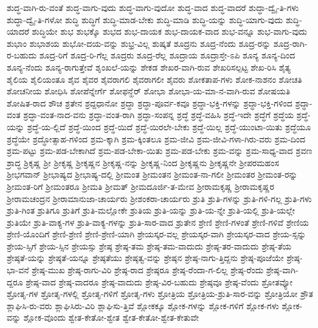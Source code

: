 {ಶುದ್ಧ-ವಾಗಿ-ರು-ವಂತೆ
ಶುದ್ಧ-ವಾಗು-ವುದು
ಶುದ್ಧ-ವಾಗು-ವುದೋ
ಶುದ್ಧ-ವಾದ
ಶುದ್ಧ-ವಾದರೆ
ಶುದ್ಧಾ-ದ್ವೈ-ತಿ-ಗಳು
ಶುದ್ಧಾ-ದ್ವೈ-ತಿ-ಗಳೋ
ಶುದ್ಧಿ
ಶುದ್ಧಿಗೆ
ಶುದ್ಧಿ-ಮಾಡ-ಬೇಕು
ಶುದ್ಧಿ-ಮಾಡಿ
ಶುದ್ಧಿ-ಯನ್ನು
ಶುದ್ಧಿ-ಯಾಗು-ವುದು
ಶುದ್ಧಿ-ಯಾದರೆ
ಶುದ್ಧಿಯೇ
ಶುಭ
ಶುಭಕ್ಕೊ
ಶುಭದ
ಶುಭ-ದಾಯಕ
ಶುಭ-ದಾಯಕ-ವಾದ
ಶುಭ-ವನ್ನೂ
ಶುಭ-ವಾಗು-ವುದು
ಶುಭಾಂ
ಶುಭಾಶಯ
ಶುಭೋ-ದಯ-ವನ್ನು
ಶುಭ್ರ-ವಿಲ್ಲ
ಶುಷ್ಕತೆ
ಶೂದ್ರನು
ಶೂದ್ರ-ನೆಂದು
ಶೂದ್ರ-ರನ್ನು
ಶೂದ್ರ-ರಾಗಿ-ರ-ಬಹುದು
ಶೂದ್ರ-ರಿಗೆ
ಶೂದ್ರ-ರಿ-ಗೆಲ್ಲ
ಶೂದ್ರರು
ಶೂದ್ರ-ರೆಲ್ಲ
ಶೂದ್ರಾಯ
ಶೂದ್ರಾಸ್ತೇ-ಽಪಿ
ಶೂನ್ಯ
ಶೂನ್ಯ-ದಿಂದ
ಶೂನ್ಯ-ನೆಂದು
ಶೂನ್ಯ-ರಾಗುತ್ತೇವೆ
ಶೃಂಖಲೆ-ಯನ್ನು
ಶೇಕಡ
ಶೇಖರ-ವಾಗಿ-ರುವ
ಶೇಖರಿಸಲ್ಪಟ್ಟ
ಶೇಖ-ರಿಸಿ
ಶೈತ್ಯ
ಶೈಲಿಯ
ಶೈಲಿಯಂತೂ
ಶೈವ
ಶೈವರ
ಶೈವರಾಗಲಿ
ಶೈವರಾಗಲೀ
ಶೈವರು
ಶೋಕತಾಪ-ಗಳು
ಶೋಕ-ನಾಶನಂ
ಶೋಚತಿ
ಶೋಚನೀಯ
ಶೋಧಿಸಿ
ಶೋಪೆನ್ನೇರ್ಗೆ
ಶೋಫನ್ಹೆರ್
ಶೋಭಾ
ಶೋಭಾ-ಯ-ಮಾ-ನ-ವಾಗಿ-ರುವ
ಶೋಷಯತಿ
ಶೋಷಿತ-ರಾದ
ಶೌಚ
ಶ್ರತೇನ
ಶ್ರದ್ದಧಾನೋ
ಶ್ರದ್ಧಾ
ಶ್ರದ್ಧಾ-ಪೂರ್ವ-ಕವೂ
ಶ್ರದ್ಧಾ-ಭಕ್ತಿ-ಗಳನ್ನು
ಶ್ರದ್ಧಾ-ಭಕ್ತಿ-ಗಳಿಂದ
ಶ್ರದ್ಧಾ-ವಂತ
ಶ್ರದ್ಧಾ-ವಂತ-ನಾದ-ವನು
ಶ್ರದ್ಧಾ-ವಂತ-ರಾಗಿ
ಶ್ರದ್ಧಾ-ಸಂಪನ್ನ
ಶ್ರದ್ಧೆ
ಶ್ರದ್ಧೆ-ವಹಿಸಿ
ಶ್ರದ್ಧೆ-ಇದೇ
ಶ್ರದ್ಧೆಗೆ
ಶ್ರದ್ಧೆಯ
ಶ್ರದ್ಧೆ-ಯನ್ನು
ಶ್ರದ್ಧೆ-ಯ-ಲ್ಲಿದೆ
ಶ್ರದ್ಧೆ-ಯಿಂದ
ಶ್ರದ್ಧೆ-ಯಿದೆ
ಶ್ರದ್ಧೆ-ಯಿರಲೇ-ಬೇಕು
ಶ್ರದ್ಧೆ-ಯಿಲ್ಲ
ಶ್ರದ್ಧೆ-ಯುಂಟಾ-ಯಿತು
ಶ್ರದ್ಧೆಯೂ
ಶ್ರದ್ಧೆಯೇ
ಶ್ರದ್ಧೋತ್ಸಾಹ-ಗಳಿಂದ
ಶ್ರಮ-ಕ್ಕಾಗಿ
ಶ್ರಮ-ಕ್ಕಿಂತಲೂ
ಶ್ರಮ-ಜೀವಿ
ಶ್ರಮ-ಜೀವಿ-ಗಳಾ-ಗಿರು-ವರು
ಶ್ರಮ-ದಿಂದ
ಶ್ರಮ-ಪಟ್ಟು
ಶ್ರಮ-ಪಡ-ಬೇಕಾಗಿದೆ
ಶ್ರಮ-ಪಡ-ಬೇಕಾ-ಯಿತು
ಶ್ರಮ-ಪಡ-ಬೇಕು
ಶ್ರಮ-ವನ್ನು
ಶ್ರಮ-ಸಾಧ್ಯ-ವಾದ
ಶ್ರವಣ
ಶ್ರಾದ್ಧ
ಶ್ರಿಕೃಷ್ಣ
ಶ್ರೀ
ಶ್ರೀಕೃಷ್ಣ
ಶ್ರೀಕೃಷ್ಣನ
ಶ್ರೀಕೃಷ್ಣ-ನನ್ನು
ಶ್ರೀಕೃಷ್ಣ-ನಿಂದ
ಶ್ರೀಕೃಷ್ಣನು
ಶ್ರೀಕೃಷ್ಣನೇ
ಶ್ರೀಪರಮಹಂಸ
ಶ್ರೀಭಗವಾನ್
ಶ್ರೀಭಾಷ್ಯದ
ಶ್ರೀಭಾಷ್ಯ-ದಲ್ಲಿ
ಶ್ರೀಮಂತ
ಶ್ರೀಮಂತನ
ಶ್ರೀಮಂತ-ನಾ-ಗಲೀ
ಶ್ರೀಮಂತರ
ಶ್ರೀಮಂತ-ರನ್ನು
ಶ್ರೀಮಂತ-ರಿಗೆ
ಶ್ರೀಮಂತರೂ
ಶ್ರೀಮತಿ
ಶ್ರೀಮತ್
ಶ್ರೀಮದೂರ್ಜಿ-ತ-ಮೇವ
ಶ್ರೀರಾಮಕೃಷ್ಣ
ಶ್ರೀರಾಮಕೃಷ್ಣರ
ಶ್ರೀರಾಮಚಂದ್ರನ
ಶ್ರೀರಾಮಾನುಜಾ-ಚಾರ್ಯರು
ಶ್ರೀಶಂಕರಾ-ಚಾರ್ಯರು
ಶ್ರುತಿ
ಶ್ರುತಿ-ಗಳನ್ನು
ಶ್ರುತಿ-ಗಳಿ-ಗಲ್ಲ
ಶ್ರುತಿ-ಗಳು
ಶ್ರುತಿ-ಗಿಂತ
ಶ್ರುತಿಗೂ
ಶ್ರುತಿಗೆ
ಶ್ರುತಿ-ಮಲ್ಲೋಕೇ
ಶ್ರುತಿಯ
ಶ್ರುತಿ-ಯನ್ನು
ಶ್ರುತಿ-ಯ-ನ್ನೇ
ಶ್ರುತಿ-ಯಲ್ಲಿ
ಶ್ರುತಿ-ಯಲ್ಲೇ
ಶ್ರುತಿಯೇ
ಶ್ರುತಿ-ವಾಕ್ಯ-ಗಳ
ಶ್ರುತಿ-ವಾಕ್ಯ-ಗಳನ್ನು
ಶ್ರುತಿ-ಸಾರ-ವಾದ
ಶ್ರುತೇನ
ಶ್ರೇಣಿ
ಶ್ರೇಣಿ-ಗಳಂತೆ
ಶ್ರೇಣಿ-ಗಳಿವೆ
ಶ್ರೇಣಿಯ
ಶ್ರೇಣಿ-ಯೊಂದಿಗೆ
ಶ್ರೇಣಿ-ಶ್ರೇಣಿ
ಶ್ರೇಣಿ-ಶ್ರೇಣಿ-ಯಾಗಿ
ಶ್ರೇಯಸ್ಕರ-ವಲ್ಲ
ಶ್ರೇಯಸ್ಕರ-ವಾಗಿ
ಶ್ರೇಯಸ್ಕರ-ವಾದ
ಶ್ರೇಯ-ಸ್ಸನ್ನು
ಶ್ರೇಯ-ಸ್ಸಿಗೆ
ಶ್ರೇಯ-ಸ್ಸಿನ
ಶ್ರೇಯಸ್ಸು
ಶ್ರೇಷ್ಠ
ಶ್ರೇಷ್ಠ-ತಮ
ಶ್ರೇಷ್ಠ-ತಮ-ವಾದುದು
ಶ್ರೇಷ್ಠ-ತರ-ವಾದುದು
ಶ್ರೇಷ್ಠ-ತೆಯ
ಶ್ರೇಷ್ಠತೆ-ಯನ್ನು
ಶ್ರೇಷ್ಠತೆ-ಯನ್ನೂ
ಶ್ರೇಷ್ಠತೆಯು
ಶ್ರೇಷ್ಠತ್ವ-ವನ್ನು
ಶ್ರೇಷ್ಠನ
ಶ್ರೇಷ್ಠ-ನಾಗು-ತ್ತಿದ್ದನು
ಶ್ರೇಷ್ಠ-ಪೂಜೆಯೇ
ಶ್ರೇಷ್ಠ-ಭಾ-ವನೆ
ಶ್ರೇಷ್ಠ-ಮುಖ
ಶ್ರೇಷ್ಠ-ರಾಗು-ವಿರಿ
ಶ್ರೇಷ್ಠ-ರಾದ
ಶ್ರೇಷ್ಠರೂ
ಶ್ರೇಷ್ಠ-ರೆಂದಾ-ಗ-ಲಿಲ್ಲ
ಶ್ರೇಷ್ಠ-ರೆಂದು
ಶ್ರೇಷ್ಠ-ವಾಗಿ-ದ್ದರೂ
ಶ್ರೇಷ್ಠ-ವಾದ
ಶ್ರೇಷ್ಠ-ವಾದರೂ
ಶ್ರೇಷ್ಠ-ವಾದುದು
ಶ್ರೇಷ್ಠ-ವಿರ-ಬಹುದು
ಶ್ರೇಷ್ಠವೂ
ಶ್ರೇಷ್ಠ-ವೆಂದು
ಶ್ರೋತವ್ಯೋ
ಶ್ರೋತೃ-ಗಳ
ಶ್ರೋತೃ-ಗಳಲ್ಲಿ
ಶ್ರೋತೃ-ಗಳಿಗೆ
ಶ್ರೋತೃ-ಗಳು
ಶ್ರೋತ್ರಿಯ
ಶ್ರೋತ್ರಿಯ-ಶ್ರುತಿ-ಸಾರ-ವನ್ನು
ಶ್ರೋತ್ರಿಯೋ
ಶ್ರೌತ
ಶ್ಲಾಘಿಸಿ-ರು-ವರು
ಶ್ಲಾಘಿಸಿರು-ವಿರಿ
ಶ್ಲಾಘಿಸು-ತ್ತಿವೆ
ಶ್ಲೋಕಕ್ಕೂ
ಶ್ಲೋಕ-ಗಳನ್ನು
ಶ್ಲೋಕ-ಗಳಿಗೆ
ಶ್ಲೋಕ-ಗಳು
ಶ್ಲೋಕ-ವನ್ನು
ಶ್ಲೋಕ-ವೊಂದು
ಶ್ವೇತ-ಕೇತೋ-ಶ್ವೇತ
ಶ್ವೇತ-ಕೇತೋ-ಶ್ವೇತ-ಕೇತುವೇ
}
